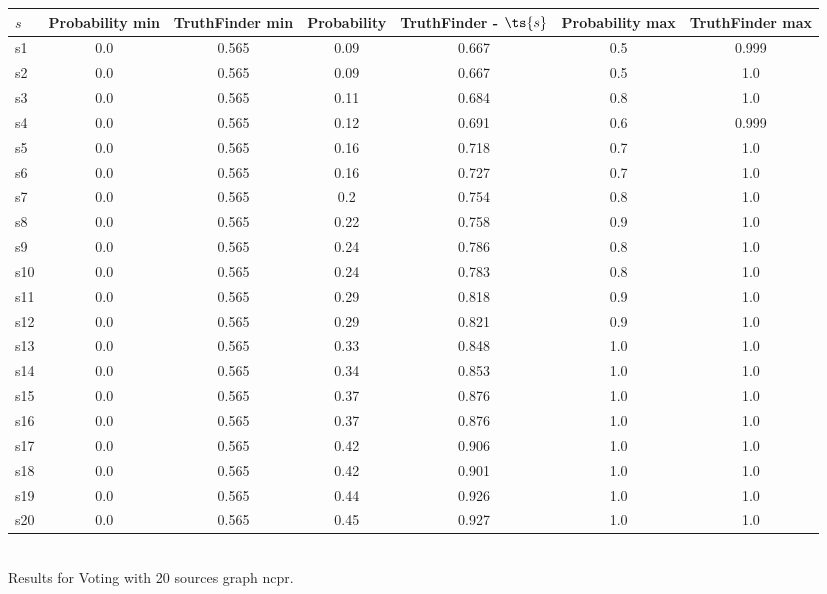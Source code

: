 \documentclass{article}
\begin{document}
\noindent\begin{tabular}{|l|c|c|c|c|c|c|}
\hline
$s$& Probability min & TruthFinder min & Probability & TruthFinder - $\ts{s}$ & Probability max & TruthFinder max\\
\hline
s1 &0.0 & 0.565 & 0.09 & 0.667 & 0.5 & 0.999\\
\hline
s2 &0.0 & 0.565 & 0.09 & 0.667 & 0.5 & 1.0\\
\hline
s3 &0.0 & 0.565 & 0.11 & 0.684 & 0.8 & 1.0\\
\hline
s4 &0.0 & 0.565 & 0.12 & 0.691 & 0.6 & 0.999\\
\hline
s5 &0.0 & 0.565 & 0.16 & 0.718 & 0.7 & 1.0\\
\hline
s6 &0.0 & 0.565 & 0.16 & 0.727 & 0.7 & 1.0\\
\hline
s7 &0.0 & 0.565 & 0.2 & 0.754 & 0.8 & 1.0\\
\hline
s8 &0.0 & 0.565 & 0.22 & 0.758 & 0.9 & 1.0\\
\hline
s9 &0.0 & 0.565 & 0.24 & 0.786 & 0.8 & 1.0\\
\hline
s10 &0.0 & 0.565 & 0.24 & 0.783 & 0.8 & 1.0\\
\hline
s11 &0.0 & 0.565 & 0.29 & 0.818 & 0.9 & 1.0\\
\hline
s12 &0.0 & 0.565 & 0.29 & 0.821 & 0.9 & 1.0\\
\hline
s13 &0.0 & 0.565 & 0.33 & 0.848 & 1.0 & 1.0\\
\hline
s14 &0.0 & 0.565 & 0.34 & 0.853 & 1.0 & 1.0\\
\hline
s15 &0.0 & 0.565 & 0.37 & 0.876 & 1.0 & 1.0\\
\hline
s16 &0.0 & 0.565 & 0.37 & 0.876 & 1.0 & 1.0\\
\hline
s17 &0.0 & 0.565 & 0.42 & 0.906 & 1.0 & 1.0\\
\hline
s18 &0.0 & 0.565 & 0.42 & 0.901 & 1.0 & 1.0\\
\hline
s19 &0.0 & 0.565 & 0.44 & 0.926 & 1.0 & 1.0\\
\hline
s20 &0.0 & 0.565 & 0.45 & 0.927 & 1.0 & 1.0\\
\hline
\end{tabular}\\

\noindent Results for Voting with 20 sources graph ncpr.
\end{document}
